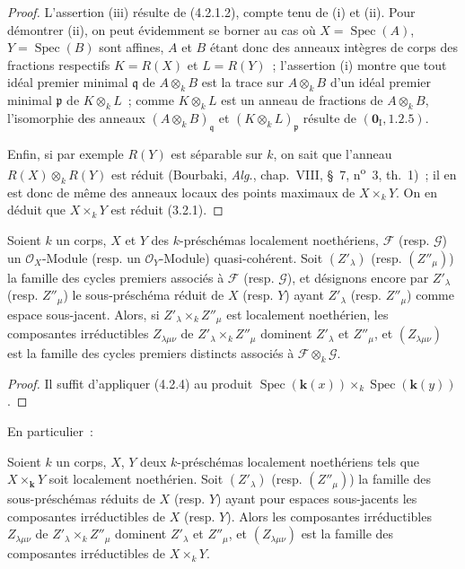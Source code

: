 \begin{proof}
L'assertion (iii) résulte de (4.2.1.2), compte tenu de (i) et (ii). Pour
démontrer (ii), on peut évidemment se borner au cas où
$X=\operatorname{Spec}(A)$, $Y=\operatorname{Spec}(B)$ sont affines, $A$ et
$B$ étant donc des anneaux intègres de corps des fractions respectifs
$K=R(X)$ et $L=R(Y)$~; l'assertion (i) montre que tout idéal premier minimal
$\mathfrak q$ de $A\otimes_k B$ est la trace sur $A\otimes_k B$ d'un idéal
premier minimal $\mathfrak p$ de $K\otimes_k L$~; comme $K\otimes_k L$ est un
anneau de fractions de $A\otimes_k B$, l'isomorphie des anneaux
$(A\otimes_k B)_{\mathfrak q}$ et $(K\otimes_k L)_{\mathfrak p}$ résulte de
$(\mathbf{0}_{\mathrm I},1.2.5)$.

Enfin, si par exemple $R(Y)$ est séparable sur $k$,
on sait que l'anneau $R(X)\otimes_k R(Y)$ est réduit (Bourbaki,
\emph{Alg.}, chap.~VIII, \S~7, n\textsuperscript{o}~3, th.~1)~; il en est donc
de même des anneaux locaux des points maximaux de $X\times_k Y$. On en déduit
que $X\times_k Y$ est réduit (3.2.1).
\end{proof}

\begin{proposition}[4.2.5]
\label{IV.2.4.2.5-fr}
Soient $k$ un corps, $X$ et $Y$ des $k$-préschémas localement noethériens,
$\mathcal F$ \textup{(resp. $\mathcal G$)} un $\mathcal O_X$-Module \textup{(resp.} un
$\mathcal O_Y$-Module\textup{)} quasi-cohérent. Soit $(Z'_\lambda)$ \textup{(resp.
$(Z''_\mu)$)} la famille des cycles premiers associés à $\mathcal F$ \textup{(resp.
$\mathcal G$)}, et désignons encore par $Z'_\lambda$ \textup{(resp. $Z''_\mu$)} le
sous-préschéma réduit de $X$ \textup{(resp. $Y$)} ayant $Z'_\lambda$ \textup{(resp.
$Z''_\mu$)} comme espace sous-jacent. Alors, si $Z'_\lambda\times_k Z''_\mu$
est localement noethérien, les composantes irréductibles $Z_{\lambda\mu\nu}$
de $Z'_\lambda\times_k Z''_\mu$ dominent $Z'_\lambda$ et $Z''_\mu$, et
$(Z_{\lambda\mu\nu})$ est la famille des cycles premiers distincts associés à
$\mathcal F\otimes_k\mathcal G$.
\end{proposition}

\begin{proof}
Il suffit d'appliquer (4.2.4) au produit
$\operatorname{Spec}(\boldsymbol{k}(x))\times_k\operatorname{Spec}(\boldsymbol{k}(y))$.
\end{proof}

En particulier~:

\begin{corollary}[4.2.6]
\label{IV.2.4.2.6-fr}
Soient $k$ un corps, $X$, $Y$ deux $k$-préschémas localement noethériens tels
que $X\times_{\boldsymbol{k}} Y$ soit localement noethérien. Soit $(Z'_\lambda)$ \textup{(resp.
$(Z''_\mu)$)} la famille des sous-préschémas réduits de $X$ \textup{(resp. $Y$)} ayant
pour espaces sous-jacents les composantes irréductibles de $X$ \textup{(resp. $Y$)}.
Alors les composantes irréductibles $Z_{\lambda\mu\nu}$ de
$Z'_\lambda\times_k Z''_\mu$ dominent $Z'_\lambda$ et $Z''_\mu$, et
$(Z_{\lambda\mu\nu})$ est la famille des composantes irréductibles de
$X\times_k Y$.
\end{corollary}

